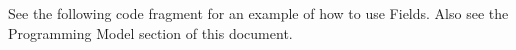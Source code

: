 

See the following code fragment for an example of
how to use Fields.  Also see
the Programming Model section of this document.



